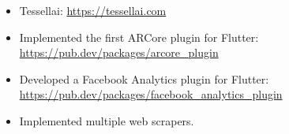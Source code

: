 \begin{itemize}
\item Tessellai:
\url{https://tessellai.com}
\newline
{}
\item Implemented the first ARCore plugin for Flutter:
\url{https://pub.dev/packages/arcore_plugin}
\newline
{}
\item Developed a Facebook Analytics plugin for Flutter:
\url{https://pub.dev/packages/facebook_analytics_plugin}
\newline
{}
\item Implemented multiple web scrapers.
\newline
{}


\end{itemize}
